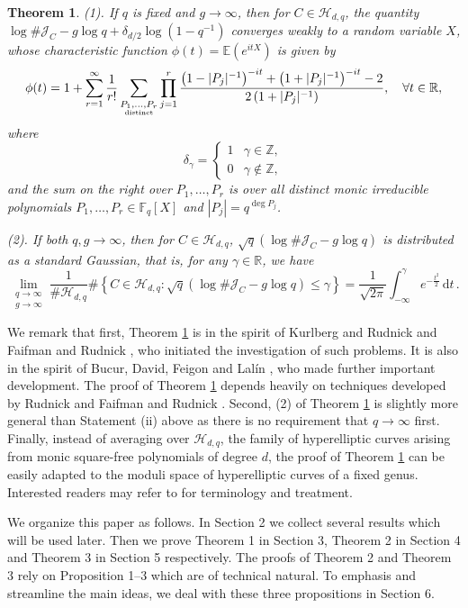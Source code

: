 \documentclass[12pt]{amsart}
\theoremstyle{plain}
\newtheorem{thm}{Theorem}
\newcommand{\Z}{{\mathbb Z}}
\newcommand{\R}{{\mathbb R}}
\newcommand{\F}{{\mathbb F}_q}
\newcommand{\E}{{\mathbb E}}
\newcommand{\J}{\mathcal J}
\newcommand{\HH}{{\mathcal H}}
\newcommand{\ud}{\mathrm{d}}
\begin{document}
\begin{thm} \label{1:thm3} (1). If $q$ is fixed and $g \to \infty$, then for $C \in \HH_{d,q}$, the quantity \\
$\log \#\J_{C}-g \log q+\delta_{d/2}\log \left(1-q^{-1}\right)$ converges weakly to a random variable $X$, whose characteristic function $\phi(t)=\E\left(e^{itX}\right)$ is given by
\[\phi(t)= 1+\sum_{r=1}^{\infty} \frac{1}{r!} \sum_{\substack{P_1,\ldots,P_r\\ \mbox{\tiny distinct}}} \prod_{j=1}^r \frac{\left(1-|P_j|^{-1}\right)^{-it}+
\left(1+|P_j|^{-1}\right)^{-it}-2}{2\left(1+|P_j|^{-1}\right)}, \quad \forall t \in \R,\]
where
\[\delta_{\gamma}=\left\{\begin{array}{cc}1&\gamma \in \Z,\\
0& \gamma \not \in \Z, \end{array}\right.\]
and the sum on the right over $P_1,\ldots,P_r$ is over all distinct monic irreducible polynomials $P_1,\ldots,P_r \in \F[X]$ and $|P_j|=q^{\deg P_j}$.

(2). If both $q,g \to \infty$, then for $C \in \HH_{d,q}$, $\sqrt{q}\left(\log \#\J_{C}-g \log q\right)$ is distributed as a standard Gaussian, that is, for any $\gamma \in \R$, we have
\[\lim_{\substack{q \to \infty\\ g \to \infty}} \frac{1}{\# \HH_{d,q}} \#\left\{C \in \HH_{d,q}: \sqrt{q}\left(\log \#\J_{C}-g \log q\right) \le \gamma\right\}=\frac{1}{\sqrt{2 \pi}} \int_{-\infty}^{\gamma} e^{-\frac{t^2}{2}}\, \ud t\,.\]
\end{thm}

We remark that first, Theorem \ref{1:thm3} is in the spirit of Kurlberg and Rudnick \cite{kur} and Faifman and Rudnick \cite{fai}, who initiated the investigation of such problems. It is also in the spirit of Bucur, David, Feigon and Lal\'in \cite{buc1,buc2}, who made further important development. The proof of Theorem \ref{1:thm3} depends heavily on techniques developed by Rudnick \cite{rud} and Faifman and Rudnick \cite{fai}. Second, (2) of Theorem \ref{1:thm3} is slightly more general than Statement (ii) above as there is no requirement that $q \to \infty$ first. Finally, instead of averaging over $\HH_{d,q}$, the family of hyperelliptic curves arising from monic square-free polynomials of degree $d$, the proof of Theorem \ref{1:thm3} can be easily adapted to the moduli space of hyperelliptic curves of a fixed genus. Interested readers may refer to \cite{buc1,buc2} for terminology and treatment.

We organize this paper as follows. In Section 2 we collect several results which will be used later. Then we prove Theorem 1 in Section 3, Theorem 2 in Section 4 and Theorem 3 in Section 5 respectively. The proofs of Theorem 2 and Theorem 3 rely on Proposition 1--3 which are of technical natural. To emphasis and streamline the main ideas, we deal with these three propositions in Section 6.
\end{document}
